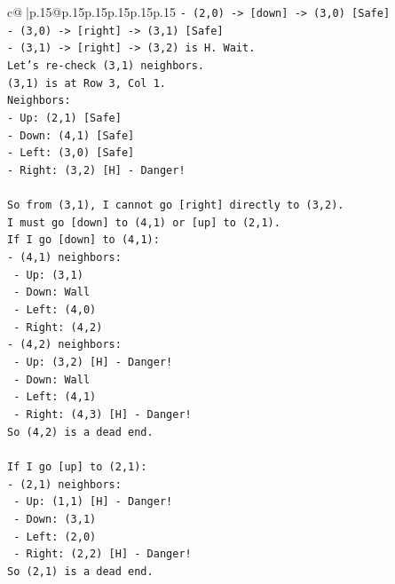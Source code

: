 \documentclass{article}
\begin{document}
{\begin{supertabular}{c@{$\;$}|p{.15\linewidth}@{}p{.15\linewidth}p{.15\linewidth}p{.15\linewidth}p{.15\linewidth}p{.15\linewidth}}
{{{\texttt{{-} (2,0) {-}> {[}down{]} {-}> (3,0) {[}Safe{]}} \\
\texttt{{-} (3,0) {-}> {[}right{]} {-}> (3,1) {[}Safe{]}} \\
\texttt{{-} (3,1) {-}> {[}right{]} {-}> (3,2) is H. Wait.} \\
\texttt{Let's re{-}check (3,1) neighbors.} \\
\texttt{(3,1) is at Row 3, Col 1.} \\
\texttt{Neighbors:} \\
\texttt{{-} Up: (2,1) {[}Safe{]}} \\
\texttt{{-} Down: (4,1) {[}Safe{]}} \\
\texttt{{-} Left: (3,0) {[}Safe{]}} \\
\texttt{{-} Right: (3,2) {[}H{]} {-} Danger!} \\
\\ 
\texttt{So from (3,1), I cannot go {[}right{]} directly to (3,2).} \\
\texttt{I must go {[}down{]} to (4,1) or {[}up{]} to (2,1).} \\
\texttt{If I go {[}down{]} to (4,1):} \\
\texttt{{-} (4,1) neighbors:} \\
\texttt{  {-} Up: (3,1)} \\
\texttt{  {-} Down: Wall} \\
\texttt{  {-} Left: (4,0)} \\
\texttt{  {-} Right: (4,2)} \\
\texttt{{-} (4,2) neighbors:} \\
\texttt{  {-} Up: (3,2) {[}H{]} {-} Danger!} \\
\texttt{  {-} Down: Wall} \\
\texttt{  {-} Left: (4,1)} \\
\texttt{  {-} Right: (4,3) {[}H{]} {-} Danger!} \\
\texttt{So (4,2) is a dead end.} \\
\\ 
\texttt{If I go {[}up{]} to (2,1):} \\
\texttt{{-} (2,1) neighbors:} \\
\texttt{  {-} Up: (1,1) {[}H{]} {-} Danger!} \\
\texttt{  {-} Down: (3,1)} \\
\texttt{  {-} Left: (2,0)} \\
\texttt{  {-} Right: (2,2) {[}H{]} {-} Danger!} \\
\texttt{So (2,1) is a dead end.} \\
}}}
\end{supertabular}}
\end{document}

